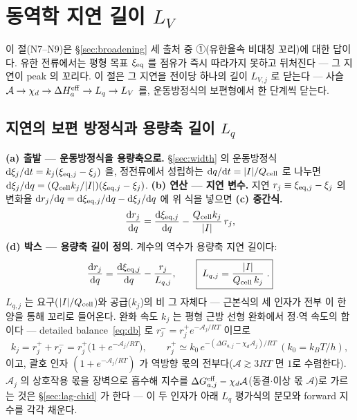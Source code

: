 \section{동역학 지연 길이 $L_V$}\label{sec:lag}
이 절(N7--N9)은 \S\ref{sec:broadening} 세 출처 중 ①(유한율속 비대칭 꼬리)에 대한 답이다. 유한 전류에서는 평형
목표 $\xi_{\mathrm{eq}}$ 를 점유가 즉시 따라가지 못하고 뒤처진다 --- 그 지연이 peak 의 꼬리다. 이 절은 그 지연을 전이당 하나의 길이 $L_{V,j}$ 로 닫는다 --- 사슬
$\mathcal A\to\chi_d\to\Delta H_a^{\mathrm{eff}}\to L_q\to L_V$ 를, 운동방정식의 보편형에서 한 단계씩 닫는다.

\subsection{지연의 보편 방정식과 용량축 길이 $L_q$}\label{sec:lag-Lq}
\textbf{(a) 출발 --- 운동방정식을 용량축으로.} \S\ref{sec:width} 의 운동방정식 $\mathrm{d}\xi_j/\mathrm{d} t=k_j(\xi_{\mathrm{eq},j}-\xi_j)$
을, 정전류에서 성립하는 $\mathrm{d} q/\mathrm{d} t=|I|/Q_{\mathrm{cell}}$ 로 나누면 $\mathrm{d}\xi_j/\mathrm{d} q=(Q_{\mathrm{cell}} k_j/|I|)(\xi_{\mathrm{eq},j}-\xi_j)$.
\textbf{(b) 연산 --- 지연 변수.} 지연 $r_j\equiv\xi_{\mathrm{eq},j}-\xi_j$ 의 변화율 $\mathrm{d} r_j/\mathrm{d} q=\mathrm{d}\xi_{\mathrm{eq},j}/\mathrm{d} q-\mathrm{d}\xi_j/\mathrm{d} q$
에 위 식을 넣으면 \textbf{(c) 중간식.}
\begin{equation}
\frac{\mathrm{d} r_j}{\mathrm{d} q}=\frac{\mathrm{d}\xi_{\mathrm{eq},j}}{\mathrm{d} q}-\frac{Q_{\mathrm{cell}} k_j}{|I|}\,r_j,
\label{eq:Lqmid}
\end{equation}
\textbf{(d) 박스 --- 용량축 길이 정의.} 계수의 역수가 용량축 지연 길이다:
\begin{equation}
\frac{\mathrm{d} r_j}{\mathrm{d} q}=\frac{\mathrm{d}\xi_{\mathrm{eq},j}}{\mathrm{d} q}-\frac{r_j}{L_{q,j}},
\qquad \boxed{\;L_{q,j}=\frac{|I|}{Q_{\mathrm{cell}}\,k_j}\;.}
\label{eq:Lq}
\end{equation}
$L_{q,j}$ 는 요구($|I|/Q_{\mathrm{cell}}$)와 공급($k_j$)의 비 그 자체다 --- 근본식의 세 인자가 전부 이 한 양을 통해 꼬리로
들어온다. 완화 속도 $k_j$ 는 평형 근방 선형 완화에서 정$\cdot$역 속도의 합이다 --- detailed balance~\eqref{eq:db} 로
$r_j^-=r_j^+e^{-\mathcal A_j/RT}$ 이므로
\begin{equation}
k_j=r_j^++r_j^-=r_j^+\big(1+e^{-\mathcal A_j/RT}\big),
\qquad r_j^+\simeq k_0\,e^{-(\Delta G_{a,j}-\chi_d\mathcal A_j)/RT}\ (k_0=k_BT/h),
\label{eq:kuniv}
\end{equation}
이고, 괄호 인자 $(1+e^{-\mathcal A_j/RT})$ 가 역방향 몫의 전부다($\mathcal A\gtrsim3RT$ 면 $1$로 수렴한다).
$\mathcal A_j$ 의 상호작용 몫을 장벽으로 흡수해 지수를 $\Delta G_{a,j}^{\mathrm{eff}}-\chi_d\mathcal A$(동결$\cdot$이상 몫
$\mathcal A$)로 가르는 것은 \S\ref{sec:lag-chid} 가 한다 --- 이 두 인자가 아래 $L_q$ 평가식의 분모와
forward 지수를 각각 채운다.


